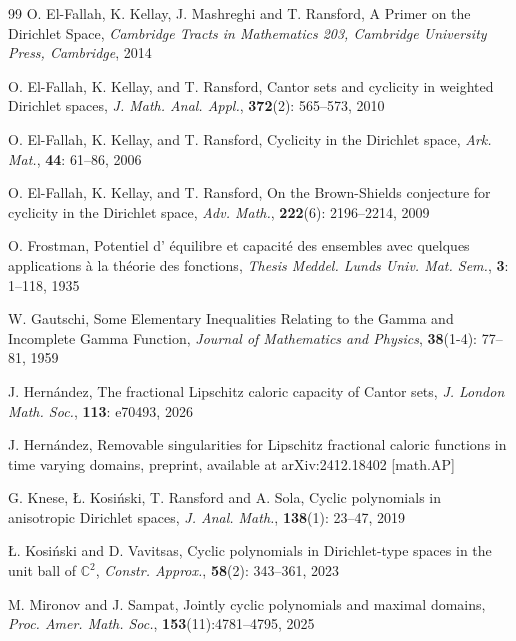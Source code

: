\documentclass[12pt]{amsart}
\theoremstyle{definition}\newtheorem{remark}[theorem]{Remark}
\theoremstyle{definition}\newtheorem{example}[theorem]{Example}
\theoremstyle{definition}\newtheorem{definition}{Definition}
\numberwithin{equation}{section}
\newcommand\CC{{\mathbb C}}
\begin{document}
\begin{thebibliography}{99}
 O. El-Fallah, K. Kellay, J. Mashreghi and T. Ransford, A Primer on the Dirichlet Space, \emph{Cambridge Tracts in Mathematics 203, Cambridge University Press, Cambridge}, 2014

 O. El-Fallah, K. Kellay, and T. Ransford, Cantor sets and cyclicity in weighted Dirichlet spaces, \emph{J. Math. Anal. Appl.}, \textbf{372}(2): 565--573, 2010

 O. El-Fallah, K. Kellay, and T. Ransford, Cyclicity in the Dirichlet space, \textit{Ark. Mat.}, \textbf{44}: 61--86, 2006

 O. El-Fallah, K. Kellay, and T. Ransford, On the Brown-Shields conjecture
for cyclicity in the Dirichlet space, \emph{Adv. Math.}, \textbf{222}(6): 2196--2214, 2009

 O. Frostman, Potentiel d’        \'{e}quilibre et capacit\'{e} des ensembles avec
quelques applications \`{a} la th\'{e}orie des fonctions, \emph{Thesis Meddel. Lunds Univ.
Mat. Sem.}, \textbf{3}: 1--118, 1935

 W. Gautschi, Some Elementary Inequalities Relating to the Gamma and Incomplete Gamma Function, \textit{Journal of Mathematics and Physics}, \textbf{38}(1-4):  77--81, 1959

J. Hernández, The fractional Lipschitz caloric capacity of Cantor sets, \emph{J. London Math. Soc.}, \textbf{113}:  e70493, 2026

J. Hernández, Removable singularities for Lipschitz fractional caloric functions in time varying domains, preprint, available at arXiv:2412.18402 [math.AP]


G. Knese, \L. Kosi\'{n}ski,  T. Ransford and A. Sola, Cyclic polynomials in anisotropic Dirichlet spaces, \emph{J. Anal. Math.}, \textbf{138}(1): 23--47, 2019

\L. Kosi\'{n}ski and D. Vavitsas, Cyclic polynomials in Dirichlet-type spaces in the unit ball of $\CC^2$, \textit{Constr. Approx.}, \textbf{58}(2): 343--361, 2023

M. Mironov and J. Sampat, Jointly cyclic polynomials and maximal domains, \emph{Proc. Amer. Math. Soc.}, \textbf{153}(11):4781--4795, 2025


\end{thebibliography}
\end{document}
